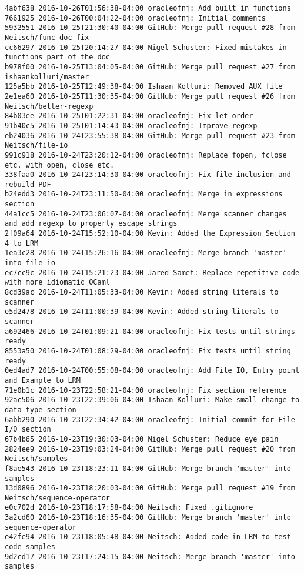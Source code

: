 \begin{lstlisting}
4abf638 2016-10-26T01:56:38-04:00 oracleofnj: Add built in functions
7661925 2016-10-26T00:04:22-04:00 oracleofnj: Initial comments
5932551 2016-10-25T21:30:40-04:00 GitHub: Merge pull request #28 from Neitsch/func-doc-fix
cc66297 2016-10-25T20:14:27-04:00 Nigel Schuster: Fixed mistakes in functions part of the doc
b978f00 2016-10-25T13:04:05-04:00 GitHub: Merge pull request #27 from ishaankolluri/master
125a5bb 2016-10-25T12:49:38-04:00 Ishaan Kolluri: Removed AUX file
2e1ea60 2016-10-25T11:30:35-04:00 GitHub: Merge pull request #26 from Neitsch/better-regexp
84b03ee 2016-10-25T01:22:31-04:00 oracleofnj: Fix let order
91b40c5 2016-10-25T01:14:43-04:00 oracleofnj: Improve regexp
eb24036 2016-10-24T23:55:38-04:00 GitHub: Merge pull request #23 from Neitsch/file-io
991c918 2016-10-24T23:20:12-04:00 oracleofnj: Replace fopen, fclose etc. with open, close etc.
338faa0 2016-10-24T23:14:30-04:00 oracleofnj: Fix file inclusion and rebuild PDF
b24edd3 2016-10-24T23:11:50-04:00 oracleofnj: Merge in expressions section
44a1cc5 2016-10-24T23:06:07-04:00 oracleofnj: Merge scanner changes and add regexp to properly escape strings
2f09a64 2016-10-24T15:52:10-04:00 Kevin: Added the Expression Section 4 to LRM
1ea3c28 2016-10-24T15:26:16-04:00 oracleofnj: Merge branch 'master' into file-io
ec7cc9c 2016-10-24T15:21:23-04:00 Jared Samet: Replace repetitive code with more idiomatic OCaml
8cd39ac 2016-10-24T11:05:33-04:00 Kevin: Added string literals to scanner
e5d2478 2016-10-24T11:00:39-04:00 Kevin: Added string literals to scanner
a692466 2016-10-24T01:09:21-04:00 oracleofnj: Fix tests until strings ready
8553a50 2016-10-24T01:08:29-04:00 oracleofnj: Fix tests until string ready
0ed4ad7 2016-10-24T00:55:08-04:00 oracleofnj: Add File IO, Entry point and Example to LRM
71e0b1c 2016-10-23T22:58:21-04:00 oracleofnj: Fix section reference
92ac506 2016-10-23T22:39:06-04:00 Ishaan Kolluri: Make small change to data type section
6abb290 2016-10-23T22:34:42-04:00 oracleofnj: Initial commit for File I/O section
67b4b65 2016-10-23T19:30:03-04:00 Nigel Schuster: Reduce eye pain
2824ee9 2016-10-23T19:03:24-04:00 GitHub: Merge pull request #20 from Neitsch/samples
f8ae543 2016-10-23T18:23:11-04:00 GitHub: Merge branch 'master' into samples
13d0896 2016-10-23T18:20:03-04:00 GitHub: Merge pull request #19 from Neitsch/sequence-operator
e0c702d 2016-10-23T18:17:58-04:00 Neitsch: Fixed .gitignore
3a2cd60 2016-10-23T18:16:35-04:00 GitHub: Merge branch 'master' into sequence-operator
e42fe94 2016-10-23T18:05:48-04:00 Neitsch: Added code in LRM to test code samples
9d2cd17 2016-10-23T17:24:15-04:00 Neitsch: Merge branch 'master' into samples

\end{lstlisting}
